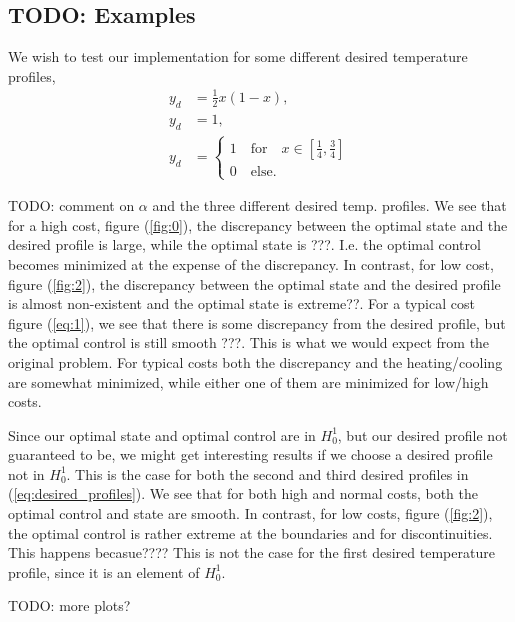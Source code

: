 \subsection{TODO: Examples}
We wish to test our implementation for some different desired temperature profiles, \begin{align}
    \label{eq:desired_profiles}
    y_d &= \frac{1}{2}x(1-x), \\
    y_d &= 1, \\
    y_d &= \begin{cases}
        1 \quad \text{for} \quad x \in \left[ \frac{1}{4}, \frac{3}{4}\right] \\
        0 \quad \text{else}.
    \end{cases}
\end{align}


TODO: comment on \( \alpha \) and the three different desired temp. profiles.
We see that for a high cost, figure (\ref{fig:0}), the discrepancy between the optimal state and the desired profile is large, while the optimal state is ???.
I.e. the optimal control becomes minimized at the expense of the discrepancy.
In contrast, for low cost, figure (\ref{fig:2}), the discrepancy between the optimal state and the desired profile is almost non-existent and the optimal state is extreme??.
For a typical cost figure (\ref{eq:1}), we see that there is some discrepancy from the desired profile, but the optimal control is still smooth ???.
This is what we would expect from the original problem. For typical costs both the discrepancy and the heating/cooling are somewhat minimized, while either one of them are minimized for low/high costs.

Since our optimal state and optimal control are in $H_0^1$, but our desired profile not guaranteed to be, we might get interesting results if we choose a desired profile not in $H_0^1$.
This is the case for both the second and third desired profiles in (\ref{eq:desired_profiles}).
We see that for both high and normal costs, both the optimal control and state are smooth.
In contrast, for low costs, figure (\ref{fig:2}), the optimal control is rather extreme at the boundaries and for discontinuities. This happens becasue????
This is not the case for the first desired temperature profile, since it is an element of $H_0^1$.


TODO: more plots?


